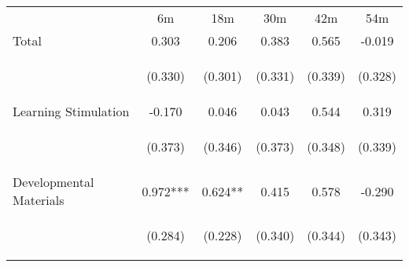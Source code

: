 \begin{tabular}{lccccc}
\hline \noalign{\smallskip} & 6m & 18m & 30m & 42m & 54m\\
\noalign{\smallskip}\hline \noalign{\smallskip}Total & 0.303 & 0.206 & 0.383 & 0.565 & -0.019\\
 & \begin{footnotesize}(0.330)\end{footnotesize} & \begin{footnotesize}(0.301)\end{footnotesize} & \begin{footnotesize}(0.331)\end{footnotesize} & \begin{footnotesize}(0.339)\end{footnotesize} & \begin{footnotesize}(0.328)\end{footnotesize}\\
\noalign{\smallskip}Learning Stimulation & -0.170 & 0.046 & 0.043 & 0.544 & 0.319\\
 & \begin{footnotesize}(0.373)\end{footnotesize} & \begin{footnotesize}(0.346)\end{footnotesize} & \begin{footnotesize}(0.373)\end{footnotesize} & \begin{footnotesize}(0.348)\end{footnotesize} & \begin{footnotesize}(0.339)\end{footnotesize}\\
\noalign{\smallskip}Developmental Materials & 0.972*** & 0.624** & 0.415 & 0.578 & -0.290\\
 & \begin{footnotesize}(0.284)\end{footnotesize} & \begin{footnotesize}(0.228)\end{footnotesize} & \begin{footnotesize}(0.340)\end{footnotesize} & \begin{footnotesize}(0.344)\end{footnotesize} & \begin{footnotesize}(0.343)\end{footnotesize}\\

\end{tabular}
